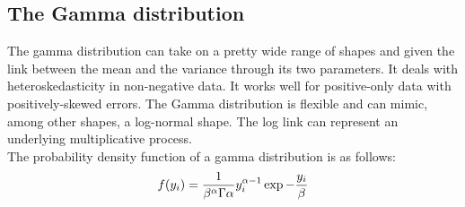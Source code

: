 \subsection*{The Gamma distribution}
The gamma distribution can take on a pretty wide range of shapes and given the link between the mean and the variance through its two parameters. It deals with heteroskedasticity in non-negative data. It works well for positive-only data with positively-skewed errors. The Gamma distribution is flexible and can mimic, among other shapes, a log-normal shape. The log link can represent an underlying multiplicative process.\\
The probability density function of a gamma distribution
is as follows:
\begin{equation}
	\centering
	f(y_i)=\frac{1}{\beta^\alpha\Gamma\alpha}y_i^{\alpha-1}\exp-\frac{y_i}{\beta}
\end{equation}
